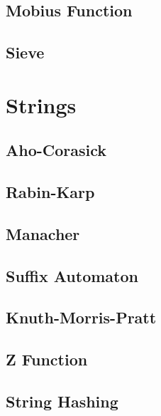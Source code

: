 \subsection{Mobius Function}
\raggedbottom
\hrulefill
\subsection{Sieve}
\raggedbottom
\hrulefill

\section{Strings}
\subsection{Aho-Corasick}
\raggedbottom
\hrulefill
\subsection{Rabin-Karp}
\raggedbottom
\hrulefill
\subsection{Manacher}
\raggedbottom
\hrulefill
\subsection{Suffix Automaton}
\raggedbottom
\hrulefill
\subsection{Knuth-Morris-Pratt}
\raggedbottom
\hrulefill
\subsection{Z Function}
\raggedbottom
\hrulefill
\subsection{String Hashing}
\raggedbottom
\hrulefill

